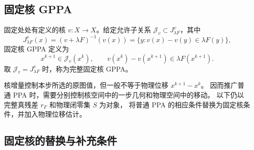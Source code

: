 \subsection{固定核 GPPA}
\label{sec:rleb-gppa-main}

\begin{definition}[固定核广义近端点算法]
\label{def:fixed-kernel-GPPA}
固定处处有定义的核 $v:X\to X$。给定允许子关系
$\mathcal J_v\subset J^v_{\lambda F}$，其中
\[
 J^v_{\lambda F}(x)
 =(v+\lambda F)^{-1}(v(x))
 =\{y:v(x)-v(y)\in\lambda F(y)\},
\]
固定核 GPPA 定义为
\begin{equation}
\label{eq:fixed-kernel-GPPA}
 x^{k+1}\in\mathcal J_v(x^k),\qquad
 v(x^k)-v(x^{k+1})\in\lambda F(x^{k+1}).
\end{equation}
取 $\mathcal J_v=J^v_{\lambda F}$ 时，称为完整固定核 GPPA。
\end{definition}

核增量控制本步所选的原图值，但一般不等于物理位移 $x^{k+1}-x^k$。
因而推广普通 PPA 时，需要分别控制核空间中的一步几何和物理空间中的移动。
以下仍以完整真残差 $r_F$ 和物理闭零集 $S$ 为对象，
将普通 PPA 的相应条件替换为固定核条件，并加入物理位移估计。

\subsection{固定核的替换与补充条件}

